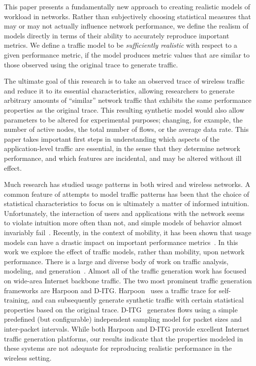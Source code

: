 \documentclass[conference]{IEEEtran}
\newcommand{\caps}[1]{{\small{#1}}}
\begin{document}
This paper presents a fundamentally new approach to creating realistic models of workload in networks. Rather than subjectively choosing statistical measures that may or may not actually influence network performance, we define the realism of models directly in terms of their ability to accurately reproduce important metrics. We define a traffic model to be \textit{sufficiently realistic} with respect to a given performance metric, if the model produces metric values that are similar to those observed using the original trace to generate traffic.

The ultimate goal of this research is to take an observed trace of wireless traffic and reduce it to its essential characteristics, allowing researchers to generate arbitrary amounts of ``similar'' network traffic that exhibits the same performance properties as the original trace. This resulting synthetic model would also allow parameters to be altered for experimental purposes; changing, for example, the number of active nodes, the total number of flows, or the average data rate. This paper takes important first steps in understanding which aspects of the application-level traffic are essential, in the sense that they determine network performance, and which features are incidental, and may be altered without ill effect. %

Much research has studied usage patterns in both wired and wireless networks. A common feature of attempts to model traffic patterns has been that the choice of statistical characteristics to focus on is ultimately a matter of informed intuition. Unfortunately, the interaction of users and applications with the network seems to violate intuition more often than not, and simple models of behavior almost invariably fail~\cite{Paxson95,Royer01,Yoon03:speed-decay}. Recently, in the context of mobility, it has been shown that usage models can have a drastic impact on important performance metrics~\cite{Camp02,Yoon03:speed-decay,Yoon03:sound-models,Jardosh03,Zheng04}. In this work we explore the effect of traffic models, rather than mobility, upon network performance.
There is a large and diverse body of work on traffic analysis, modeling, and generation~\cite{Paxson95,Paxson96,Sommers04,Avallone04,Avallone06,Hernandez06}. Almost all of the traffic generation work has focused on wide-area Internet backbone traffic. The two most prominent traffic generation frameworks are Harpoon and \caps{D-ITG}. Harpoon~\cite{Sommers04} uses a traffic trace for self-training, and can subsequently generate synthetic traffic with certain statistical properties based on the original trace. \caps{D-ITG}~\cite{Avallone04,Avallone06} generates flows using a simple predefined (but configurable) independent sampling model for packet sizes and inter-packet intervals. While both Harpoon and \caps{D-ITG} provide excellent Internet traffic generation platforms, our results indicate that the properties modeled in these systems are not adequate for reproducing realistic performance in the wireless setting.
\end{document}
